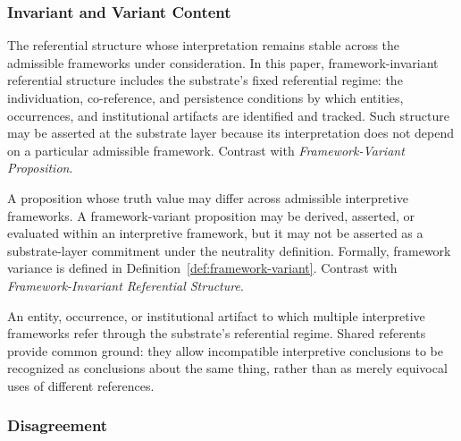 \subsubsection*{Invariant and Variant Content}

\begin{description}[style=nextline,leftmargin=1.5cm]

\item[Framework-Invariant Referential Structure]
The referential structure whose interpretation
remains stable
across the admissible frameworks under consideration.
In this paper, framework-invariant referential structure
includes the substrate's fixed referential regime:
the individuation, co-reference, and persistence conditions
by which entities, occurrences, and institutional artifacts
are identified and tracked.
Such structure may be asserted at the substrate layer
because its interpretation does not depend on
a particular admissible framework.
Contrast with \emph{Framework-Variant Proposition}.

\item[Framework-Variant Proposition]
A proposition whose truth value may differ across
admissible interpretive frameworks.
A framework-variant proposition may be derived,
asserted, or evaluated within an interpretive framework,
but it may not be asserted as a substrate-layer commitment
under the neutrality definition.
Formally, framework variance is defined in
Definition~\ref{def:framework-variant}.
Contrast with \emph{Framework-Invariant Referential Structure}.

\item[Shared Referent]
An entity, occurrence, or institutional artifact
to which multiple interpretive frameworks refer
through the substrate's referential regime.
Shared referents provide common ground:
they allow incompatible interpretive conclusions
to be recognized as conclusions about the same thing,
rather than as merely equivocal uses of different references.

\end{description}

\subsubsection*{Disagreement}

